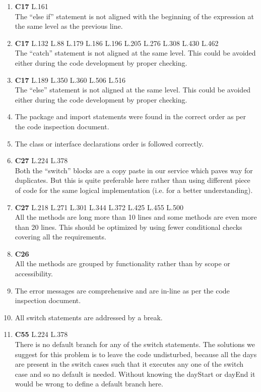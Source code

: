 \begin{enumerate}	
	\item \textbf{C17} L.161 \\ {The ``else if'' statement is not aligned with the beginning of the expression at the same level as the previous line.}
	\item \textbf{C17} L.132 L.88 L.179 L.186 L.196 L.205 L.276 L.308 L.430 L.462 \\ The ``catch'' statement is not aligned at the same level. This could be avoided either during the code development by proper checking.
	\item \textbf{C17} L.189 L.350 L.360 L.506 L.516 \\ The ``else'' statement is not aligned at the same level. This could be avoided either during the code development by proper checking.
	\item The package and import statements were found in the correct order as per the code inspection document.
	\item The class or interface declarations order is followed correctly.
	\item \textbf{C27} L.224 L.378 \\ Both the ``switch'' blocks are a copy paste in our service which paves way for duplicates. But this is quite preferable here rather than using different piece of code for the same logical implementation (i.e. for a better understanding).
	\item \textbf{C27} L.218 L.271 L.301 L.344 L.372 L.425 L.455 L.500 \\ All the methods are long more than 10 lines and some methods are even more than 20 lines. This should be optimized by using fewer conditional checks covering all the requirements.
	\item \textbf{C26} \\ All the methods are grouped by functionality rather than by scope or accessibility.
	\item The error messages are comprehensive and are in-line as per the code inspection document.
	\item  All switch statements are addressed by a break.
	\item \textbf{C55} L.224 L.378 \\ There is no default branch for any of the switch statements. The solutions we suggest for this problem is to leave the code undisturbed, because all the days are present in the switch cases such that it executes any one of the switch case and so no default is needed. Without
knowing the dayStart or dayEnd it would be wrong to define a default branch here.
	

\end{enumerate}
